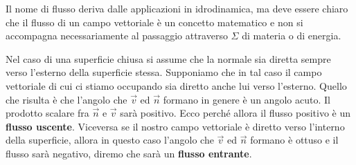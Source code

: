 Il nome di flusso deriva dalle applicazioni in idrodinamica, ma deve essere chiaro che il flusso di un campo vettoriale è un concetto matematico e non si accompagna necessariamente al passaggio attraverso $\Sigma$ di materia o di energia.

Nel caso di una superficie chiusa si assume che la normale sia diretta sempre verso l'esterno della superficie stessa. Supponiamo che in tal caso il campo vettoriale di cui ci stiamo occupando sia diretto anche lui verso l'esterno. Quello che risulta è che l'angolo che $\vec{v}$ ed $\vec{n}$ formano in genere è un angolo acuto. Il prodotto scalare fra $\vec{n}$ e $\vec{v}$ sarà positivo. Ecco perché allora il flusso positivo è un \textbf{flusso uscente}. Viceversa se il nostro campo vettoriale è diretto verso l'interno della superficie, allora in questo caso l'angolo che $\vec{v}$ ed $\vec{n}$ formano è ottuso e il flusso sarà negativo, diremo che sarà un \textbf{flusso entrante}.

